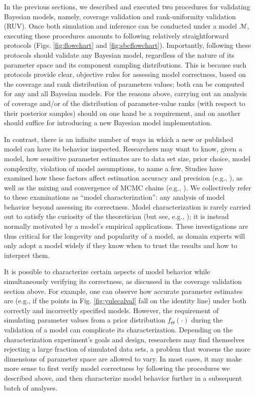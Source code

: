 \documentclass[oneside]{article}
\begin{document}
In the previous sections, we described and executed two procedures for validating Bayesian models, namely, coverage validation and rank-uniformity validation (RUV).
Once both simulation and inference can be conducted under a model $\mathcal{M}$, executing these procedures amounts to following relatively straightforward protocols (Figs. \ref{fig:flowchart} and \ref{fig:sbcflowchart}).
Importantly, following these protocols should validate any Bayesian model, regardless of the nature of its parameter space and its component sampling distributions.
This is because such protocols provide clear, objective rules for
assessing model correctness, based on the coverage and rank
distribution of parameters values; both can be computed for any and all Bayesian models.
For the reasons above, carrying out an analysis of coverage and/or of the distribution of parameter-value ranks (with respect to their posterior samples) should on one hand be a requirement, and on another should suffice for introducing a new Bayesian model implementation.

In contrast, there is an infinite number of ways in which a new or published model can have its behavior inspected.
Researchers may want to know, given a model, how sensitive parameter estimates are to data set size, prior choice, model complexity, violation of model assumptions, to name a few.
Studies have examined how these factors affect estimation accuracy and precision (e.g., \citealp{zhang23,luo23}), as well as the mixing and convergence of MCMC chains (e.g., \citealp{nylander04,zhang23}).
We collectively refer to these examinations as ``model characterization'': any analysis of model behavior beyond assessing its correctness.
Model characterization is rarely carried out to satisfy the curiosity of the theoretician (but see, e.g., \citealp{tuffley97,steel20}); it is instead normally motivated by a model's empirical applications.
These investigations are thus critical for the longevity and popularity of a model, as domain experts will only adopt a model widely if they know when to trust the results and how to interpret them.

It is possible to characterize certain aspects of model behavior while simultaneously verifying its correctness, as discussed in the coverage validation section above.
For example, one can observe how accurate parameter estimates are (e.g., if the points in Fig. \ref{fig:yulecalval} fall on the identity line) under both correctly and incorrectly specified models.
However, the requirement of simulating parameter values from a prior distribution $f_{\Theta}(\cdot)$ during the validation of a model can complicate its characterization.
Depending on the characterization experiment's goals and design, researchers may find themselves rejecting a large fraction of simulated data sets, a problem that worsens the more dimensions of parameter space are allowed to vary.
In most cases, it may make more sense to first verify model correctness by following the procedures we described above, and then characterize model behavior further in a subsequent batch of analyses.
\end{document}
